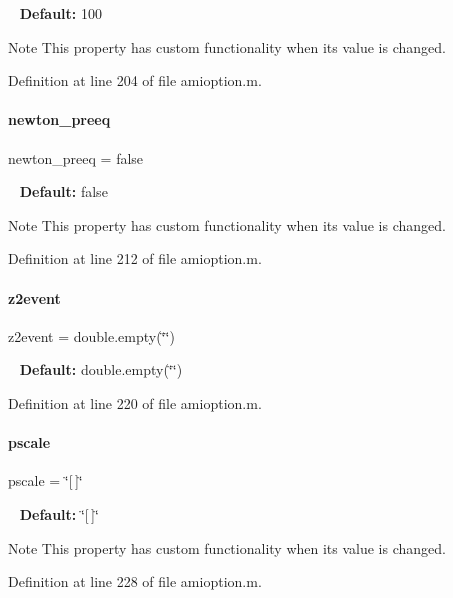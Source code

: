 ~\newline
{\bfseries Default\+:} 100

\begin{DoxyNote}{Note}
This property has custom functionality when its value is changed. 
\end{DoxyNote}


Definition at line 204 of file amioption.\+m.

\mbox{\label{classamioption_a6f07b6b706ac3305e478f576747ad088}} 
\paragraph{\texorpdfstring{newton\+\_\+preeq}{newton\_preeq}}
{\footnotesize\ttfamily newton\+\_\+preeq = false}

~\newline
{\bfseries Default\+:} false

\begin{DoxyNote}{Note}
This property has custom functionality when its value is changed. 
\end{DoxyNote}


Definition at line 212 of file amioption.\+m.

\mbox{\label{classamioption_a7a7be015feeb7a346dceccd49e622b4b}} 
\paragraph{\texorpdfstring{z2event}{z2event}}
{\footnotesize\ttfamily z2event = double.\+empty(\char`\"{}\char`\"{})}

~\newline
{\bfseries Default\+:} double.\+empty(\char`\"{}\char`\"{}) 

Definition at line 220 of file amioption.\+m.

\mbox{\label{classamioption_a4dc67beb394b49ebeccf6a99dd932ee3}} 
\paragraph{\texorpdfstring{pscale}{pscale}}
{\footnotesize\ttfamily pscale = \char`\"{}\mbox{[}$\,$\mbox{]}\char`\"{}}

~\newline
{\bfseries Default\+:} \char`\"{}\mbox{[}$\,$\mbox{]}\char`\"{}

\begin{DoxyNote}{Note}
This property has custom functionality when its value is changed. 
\end{DoxyNote}


Definition at line 228 of file amioption.\+m.

